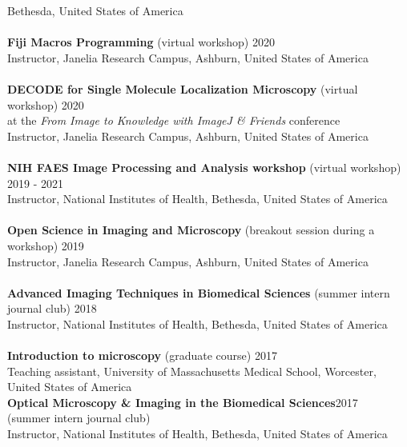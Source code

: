 \documentclass[margin,line]{res}
\begin{document}
\begin{resume}
Bethesda, United States of America\\
\vspace*{-3mm}\\
{\bf Fiji Macros Programming} (virtual workshop)  \hfill 2020\\
Instructor, Janelia Research Campus, Ashburn, United States of America\\
\vspace*{-3mm}\\
{\bf DECODE for Single Molecule Localization Microscopy} (virtual workshop)  \hfill 2020\\
at the \emph{From Image to Knowledge with ImageJ \& Friends} conference\\
Instructor, Janelia Research Campus, Ashburn, United States of America\\
\vspace*{-3mm}\\
{\bf  NIH FAES Image Processing and Analysis workshop} (virtual workshop)  \hfill 2019 - 2021\\
 Instructor, National Institutes of Health, Bethesda, United States of America\\
\vspace*{-3mm}\\
{\bf  Open Science in Imaging and Microscopy} (breakout session during a workshop)  \hfill 2019\\
Instructor, Janelia Research Campus, Ashburn, United States of America\\
\vspace*{-3mm}\\
{\bf Advanced Imaging Techniques in Biomedical Sciences} (summer intern journal club) \hfill {2018}\\
Instructor, National Institutes of Health, Bethesda, United States of America \\
\vspace*{-3mm}\\
{\bf Introduction to microscopy} (graduate course) \hfill {2017}\\
Teaching assistant, University of Massachusetts Medical School, Worcester, \\
United States of America\\
{\bf Optical Microscopy \& Imaging in the Biomedical Sciences}\hfill {2017}\\
 (summer intern journal club) \\
 Instructor, National Institutes of Health, Bethesda, United States of America \\

\end{resume}
\end{document}
